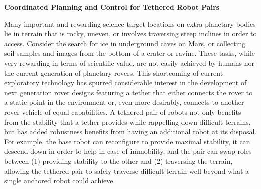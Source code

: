 \documentclass[12pt]{article}
\begin{document}
\newpage

\begin{center}
{\bf Coordinated Planning and Control for Tethered Robot Pairs }

\end{center}

Many important and rewarding science target locations on extra-planetary bodies lie in terrain that is 
rocky, uneven, or involves traversing steep inclines in order to access. Consider the search for ice in 
underground caves on Mars, or collecting soil samples and images from the bottom of a crater or ravine. 
These tasks, while very rewarding in terms of scientific value, are not easily achieved by humans nor 
the current generation of planetary rovers. This shortcoming of current exploratory technology has spurred 
considerable interest in the development of next generation rover designs featuring a tether that either 
connects the rover to a static point in the environment or, even more desirably, connects to another rover 
vehicle of equal capabilities. A tethered pair of robots not only benefits from the stability that a tether 
provides while rappelling down difficult terrains, but has added robustness benefits from having an additional robot 
at its disposal. For example, the base robot can reconfigure to provide maximal stability, it can descend down in order to help 
in case of immobility, and the pair can swap roles between (1) providing stability to the other and (2) traversing the 
terrain, allowing the tethered pair to safely traverse difficult terrain well beyond what a single anchored robot 
could achieve. 
\end{document}
